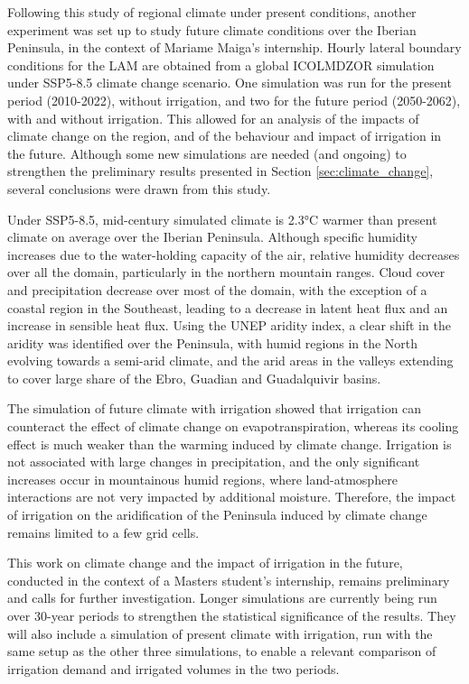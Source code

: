 \hfill

Following this study of regional climate under present conditions, another experiment was set up to study future climate conditions over the Iberian Peninsula, in the context of Mariame Maiga's internship.
Hourly lateral boundary conditions for the LAM are obtained from a global ICOLMDZOR simulation under SSP5-8.5 climate change scenario. 
One simulation was run for the present period (2010-2022), without irrigation, and two for the future period (2050-2062), with and without irrigation. This allowed for an analysis of the impacts of climate change on the region, and of the behaviour and impact of irrigation in the future. 
Although some new simulations are needed (and ongoing) to strengthen the preliminary results presented in Section \ref{sec:climate_change}, several conclusions were drawn from this study. 

Under SSP5-8.5, mid-century simulated climate is 2.3°C warmer than present climate on average over the Iberian Peninsula. Although specific humidity increases due to the water-holding capacity of the air, relative humidity decreases over all the domain, particularly in the northern mountain ranges. Cloud cover and precipitation decrease over most of the domain, with the exception of a coastal region in the Southeast, leading to a decrease in latent heat flux and an increase in sensible heat flux. Using the UNEP aridity index, a clear shift in the aridity was identified over the Peninsula, with humid regions in the North evolving towards a semi-arid climate, and the arid areas in the valleys extending to cover large share of the Ebro, Guadian and Guadalquivir basins.

The simulation of future climate with irrigation showed that irrigation can counteract the effect of climate change on evapotranspiration, whereas its cooling effect is much weaker than the warming induced by climate change. Irrigation is not associated with large changes in precipitation, and the only significant increases occur in mountainous humid regions, where land-atmosphere interactions are not very impacted by additional moisture. 
Therefore, the impact of irrigation on the aridification of the Peninsula induced by climate change remains limited to a few grid cells.

This work on climate change and the impact of irrigation in the future, conducted in the context of a Masters student's internship, remains preliminary and calls for further investigation. Longer simulations are currently being run over 30-year periods to strengthen the statistical significance of the results. They will also include a simulation of present climate with irrigation, run with the same setup as the other three simulations, to enable a relevant comparison of irrigation demand and irrigated volumes in the two periods.

\clearpage
